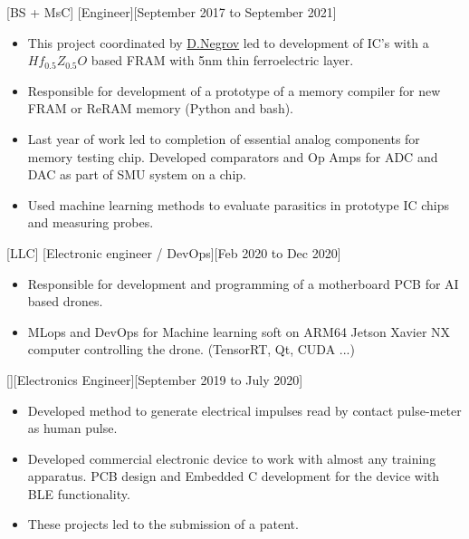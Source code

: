 \documentclass{article}
\begin{document}
[BS + MsC]
[Engineer][September 2017 to September 2021]

\begin{itemize}
\item This project coordinated by  \href{https://www.scopus.com/authid/detail.uri?authorId=56272708000}{D.Negrov}   led to development of IC's with a $Hf_{0.5} Z_{0.5} O $ based  FRAM with 5nm thin ferroelectric layer.
\item Responsible for development of a prototype of a memory  compiler for new FRAM or ReRAM memory (Python and bash).
\item Last year of work led to completion of essential analog components for memory testing chip. Developed comparators and Op Amps for ADC and DAC as part of SMU system on a chip.
\item Used machine learning methods to evaluate parasitics in prototype IC chips and measuring probes.

\end{itemize}
 

 
[LLC]
[Electronic engineer / DevOps][Feb 2020 to Dec 2020]
 
\begin{itemize}
\item Responsible for development and programming of a motherboard PCB for AI based drones.
\item MLops and DevOps for Machine learning soft on ARM64 Jetson Xavier NX computer controlling the drone. (TensorRT, Qt, CUDA ...)
\end{itemize}
 
 
[][Electronics Engineer][September 2019 to July 2020]
 
\begin{itemize}
\item Developed method to generate electrical impulses read by contact pulse-meter as human pulse. 
\item Developed commercial electronic device to work with almost any training apparatus. PCB design and Embedded C development for the device with BLE functionality. 
\item These projects led to the submission of a patent.
\end{itemize}
 
\end{document}
